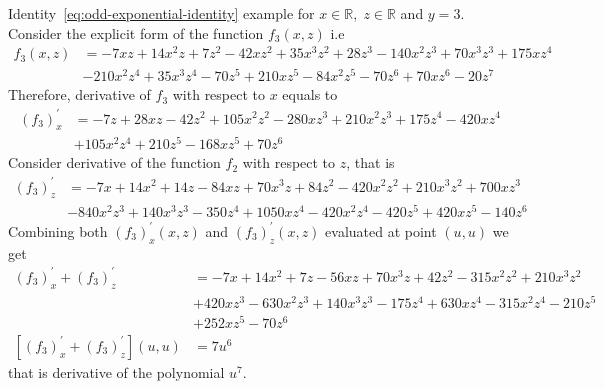 \begin{example}
    \normalfont
    Identity~\eqref{eq:odd-exponential-identity} example for $x\in\mathbb{R}, \; z\in \mathbb{R}$ and $y=3$.
    Consider the explicit form of the function $f_{3} (x, z)$ i.e
    \begin{align*}
        f_3 (x, z) &= -7 x z + 14 x^2 z + 7 z^2 - 42 x z^2 + 35 x^3 z^2 + 28 z^3 -140 x^2 z^3 + 70 x^3 z^3 + 175 x z^4 \\
        &- 210 x^2 z^4 + 35 x^3 z^4 -70 z^5 + 210 x z^5 - 84 x^2 z^5 - 70 z^6 + 70 x z^6 - 20 z^7
    \end{align*}
    Therefore, derivative of $f_{3}$ with respect to $x$ equals to
    \begin{align*}
    (f_3)
        ^{'}_{x} &= -7 z + 28 x z - 42 z^2 + 105 x^2 z^2 - 280 x z^3 + 210 x^2 z^3 + 175 z^4 - 420 x z^4 \\
        &+ 105 x^2 z^4 + 210 z^5 - 168 x z^5 + 70 z^6
    \end{align*}
    Consider derivative of the function $f_2$ with respect to $z$, that is
    \begin{align*}
    (f_3)
        ^{'}_{z} &= -7 x + 14 x^2 + 14 z - 84 x z + 70 x^3 z + 84 z^2 - 420 x^2 z^2 + 210 x^3 z^2 + 700 x z^3 \\
        &- 840 x^2 z^3 + 140 x^3 z^3 - 350 z^4 + 1050 x z^4 - 420 x^2 z^4 - 420 z^5 + 420 x z^5 - 140 z^6
    \end{align*}
    Combining both $(f_3)^{'}_{x} (x, z)$ and $(f_3)^{'}_{z} (x, z)$ evaluated at point $(u, u)$ we get
    \begin{align*}
    (f_3) ^{'}_{x} + (f_3)^{'}_{z} &= -7 x + 14 x^2 + 7 z - 56 x z + 70 x^3 z + 42 z^2 - 315 x^2 z^2 + 210 x^3 z^2 \\
        &+ 420 x z^3 - 630 x^2 z^3 + 140 x^3 z^3 - 175 z^4 + 630 x z^4 - 315 x^2 z^4 - 210 z^5 \\
        &+ 252 x z^5 - 70 z^6 \\
    [(f_3) ^{'}_{x} + (f_3)^{'}_{z}] (u,u) &= 7 u^6
    \end{align*}
    that is derivative of the polynomial $u^7$.
\end{example}